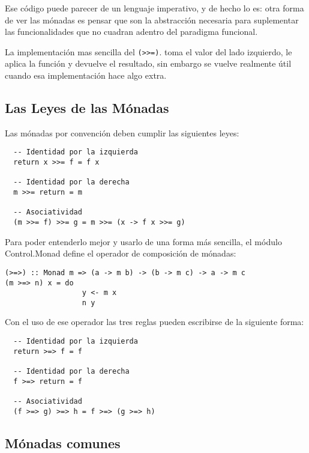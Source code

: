 Ese código puede parecer de un lenguaje imperativo, y de hecho lo es: otra
forma de ver las mónadas es pensar que son la abstracción necesaria para
suplementar las funcionalidades que no cuadran adentro del paradigma funcional.

La implementación mas sencilla del \lstinline$(>>=)$. toma el valor del lado
izquierdo, le aplica la función y devuelve el resultado, sin embargo se vuelve
realmente útil cuando esa implementación hace algo extra.

\subsection{Las Leyes de las Mónadas} %
\label{sub:las_leyes_de_las_m_nadas}

Las mónadas por convención deben cumplir las siguientes leyes:

\begin{lstlisting}
  -- Identidad por la izquierda
  return x >>= f = f x

  -- Identidad por la derecha
  m >>= return = m

  -- Asociatividad
  (m >>= f) >>= g = m >>= (x -> f x >>= g)
\end{lstlisting}

Para poder entenderlo mejor y usarlo de una forma más sencilla, el módulo
Control.Monad define el operador de composición de mónadas:

\begin{lstlisting}
(>=>) :: Monad m => (a -> m b) -> (b -> m c) -> a -> m c
(m >=> n) x = do
                  y <- m x
                  n y
\end{lstlisting}

Con el uso de ese operador las tres reglas pueden escribirse de la siguiente
forma:

\begin{lstlisting}
  -- Identidad por la izquierda
  return >=> f = f

  -- Identidad por la derecha
  f >=> return = f

  -- Asociatividad
  (f >=> g) >=> h = f >=> (g >=> h)
\end{lstlisting}


\subsection{Mónadas comunes} %
\label{sub:m_nadas_comunes}

